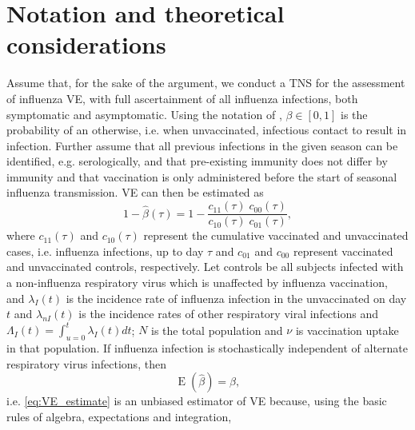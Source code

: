 \documentclass{article}[11pt]
\DeclareMathOperator{\E}{E}
\begin{document}
\section*{Notation and theoretical considerations}
Assume that, for the sake of the argument, we conduct a TNS for the assessment of influenza VE, with full ascertainment of all influenza infections, both symptomatic and asymptomatic. Using the notation of \textcite{Wu2018influence}, $\beta \in [0,1]$ is the probability of an otherwise, i.e. when unvaccinated, infectious contact to result in infection. Further assume that all previous infections in the given season can be identified, e.g. serologically, and that pre-existing immunity does not differ by immunity and that vaccination is only administered before the start of seasonal influenza transmission. VE can then be estimated as
%
\begin{equation}
\label{eq:VE_estimate}
1- \hat{\beta}(\tau) = 1 - \frac{c_{11}(\tau) \; c_{00}(\tau)}{c_{10}(\tau)\; c_{01}(\tau)},
\end{equation}
%
where $c_{11}(\tau)$ and $c_{10}(\tau)$ represent the cumulative vaccinated and unvaccinated cases, i.e. influenza infections, up to day $\tau$ and $c_{01}$ and $c_{00}$ represent vaccinated and unvaccinated controls, respectively. Let controls be all subjects infected with a non-influenza respiratory virus which is unaffected by influenza vaccination, and $\lambda_I(t)$ is the incidence rate of influenza infection in the unvaccinated on day $t$ and $\lambda_{nI}(t)$ is the incidence rates of other respiratory viral infections and $\Lambda_I(t) = \int_{u=0}^{t} \lambda_I(t) dt$; $N$ is the total population and $\nu$ is vaccination uptake in that population.
If influenza infection is stochastically independent of alternate respiratory virus infections, then 
\begin{equation}
\label{eq:unbiased}
\E(\hat{\beta}) = \beta,
\end{equation}
%
i.e. \eqref{eq:VE_estimate} is an unbiased estimator of VE because, using the basic rules of algebra, expectations and integration,
%
\end{document}

